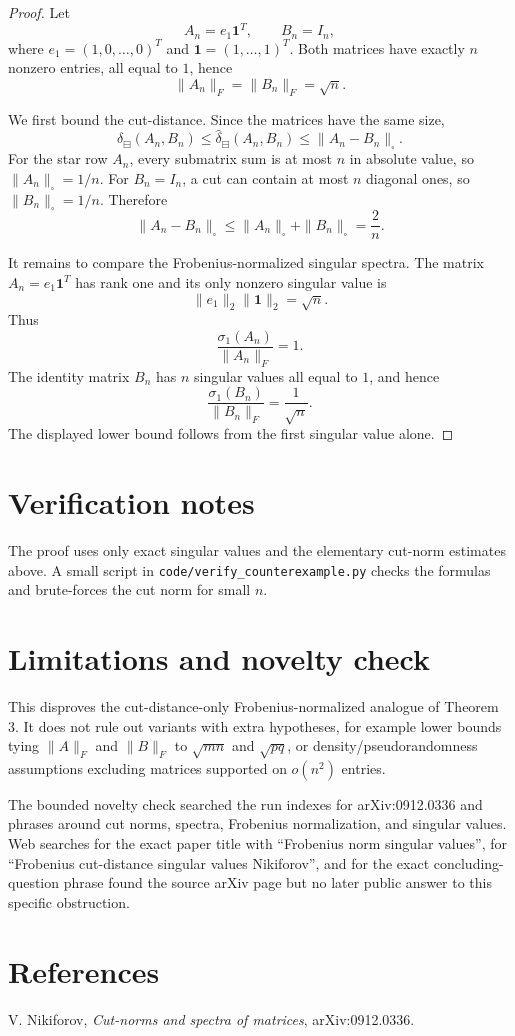 \documentclass[11pt]{article}
\newcommand{\one}{\mathbf 1}
\begin{document}
\begin{proof}
Let
\[
  A_n=e_1\one^T,\qquad B_n=I_n,
\]
where \(e_1=(1,0,\ldots,0)^T\) and \(\one=(1,\ldots,1)^T\).  Both matrices have exactly \(n\) nonzero entries, all equal to \(1\), hence
\[
  \|A_n\|_F=\|B_n\|_F=\sqrt n.
\]

We first bound the cut-distance.  Since the matrices have the same size,
\[
  \delta_{\boxminus}(A_n,B_n)
  \le \widehat\delta_{\boxminus}(A_n,B_n)
  \le \|A_n-B_n\|_\square.
\]
For the star row \(A_n\), every submatrix sum is at most \(n\) in absolute value, so \(\|A_n\|_\square=1/n\).  For \(B_n=I_n\), a cut can contain at most \(n\) diagonal ones, so \(\|B_n\|_\square=1/n\).  Therefore
\[
  \|A_n-B_n\|_\square\le \|A_n\|_\square+\|B_n\|_\square=\frac2n.
\]

It remains to compare the Frobenius-normalized singular spectra.  The matrix \(A_n=e_1\one^T\) has rank one and its only nonzero singular value is
\[
  \|e_1\|_2\|\one\|_2=\sqrt n.
\]
Thus
\[
  \frac{\sigma_1(A_n)}{\|A_n\|_F}=1.
\]
The identity matrix \(B_n\) has \(n\) singular values all equal to \(1\), and hence
\[
  \frac{\sigma_1(B_n)}{\|B_n\|_F}=\frac1{\sqrt n}.
\]
The displayed lower bound follows from the first singular value alone.
\end{proof}

\section*{Verification notes}

The proof uses only exact singular values and the elementary cut-norm estimates above.  A small script in \texttt{code/verify\_counterexample.py} checks the formulas and brute-forces the cut norm for small \(n\).

\section*{Limitations and novelty check}

This disproves the cut-distance-only Frobenius-normalized analogue of Theorem 3.  It does not rule out variants with extra hypotheses, for example lower bounds tying \(\|A\|_F\) and \(\|B\|_F\) to \(\sqrt{mn}\) and \(\sqrt{pq}\), or density/pseudorandomness assumptions excluding matrices supported on \(o(n^2)\) entries.

The bounded novelty check searched the run indexes for arXiv:0912.0336 and phrases around cut norms, spectra, Frobenius normalization, and singular values.  Web searches for the exact paper title with ``Frobenius norm singular values'', for ``Frobenius cut-distance singular values Nikiforov'', and for the exact concluding-question phrase found the source arXiv page but no later public answer to this specific obstruction.

\section*{References}

V. Nikiforov, \emph{Cut-norms and spectra of matrices}, arXiv:0912.0336.
\end{document}

